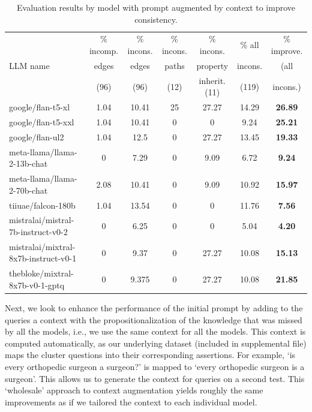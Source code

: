 \documentclass{article} %
\begin{document}
\begin{table}[htbp]
\small
  \centering
  \caption{Evaluation results by model with prompt augmented by context to improve consistency.}
  \setlength{\tabcolsep}{2pt}
  \setlength{\tabcolsep}{2pt}
    \begin{tabular}{lcccccc}
    \toprule
    \multicolumn{1}{l}{\multirow{3}[1]{*}{LLM name}} & \multicolumn{1}{c}{\% incomp.} & \multicolumn{1}{c}{\% incons.} & \multicolumn{1}{c}{\% incons.} & \multicolumn{1}{c}{\% incons.} & \multicolumn{1}{c}{\% all} & \multicolumn{1}{c}{\% improve.}\\
          
    & \multicolumn{1}{c}{edges} & \multicolumn{1}{c}{edges} & \multicolumn{1}{c}{paths} & \multicolumn{1}{c}{property} & \multicolumn{1}{c}{incons.}  & \multicolumn{1}{c}{(all}\\
          & \multicolumn{1}{c}{(96)}      &  (96)     &  (12)     & \multicolumn{1}{c}{inherit. (11)} & \multicolumn{1}{c}{(119)} & \multicolumn{1}{c}{incons.)}\\
    \midrule
    google/flan-t5-xl & 1.04  & 10.41 & 25    & 27.27 & 14.29 & \textbf{26.89} \\
    google/flan-t5-xxl & 1.04  & 10.41 & 0     & 0     & 9.24  & \textbf{25.21} \\
    google/flan-ul2 & 1.04  & 12.5  & 0     & 27.27 & 13.45 & \textbf{19.33} \\
    meta-llama/llama-2-13b-chat & 0     & 7.29  & 0     & 9.09  & 6.72  & \textbf{9.24} \\
    meta-llama/llama-2-70b-chat & 2.08  & 10.41 & 0     & 9.09  & 10.92 & \textbf{15.97} \\
    tiiuae/falcon-180b & 1.04  & 13.54 & 0     & 0     & 11.76 & \textbf{7.56} \\
    mistralai/mistral-7b-instruct-v0-2 & 0     & 6.25  & 0     & 0     & 5.04  & \textbf{4.20} \\
    mistralai/mixtral-8x7b-instruct-v0-1 & 0     & 9.37  & 0     & 27.27 & 10.08 & \textbf{15.13} \\
    thebloke/mixtral-8x7b-v0-1-gptq & 0     & 9.375 & 0     & 27.27 & 10.08 & \textbf{21.85}\\  
    \bottomrule
    \end{tabular}%
  \label{tab:eval_prompt_context}%
\end{table}%


Next, we look to enhance the performance of the initial prompt by adding to the queries a context with the propositionalization of the knowledge that was missed by all the models, i.e., we use the same context for all the models. This context is computed automatically, as our underlying dataset (included in supplemental file) maps the cluster questions into their corresponding assertions. For example, `is every orthopedic surgeon a surgeon?' is mapped to `every orthopedic surgeon is a surgeon'. This allows us to generate the context for queries on a second test. This `wholesale' approach to context augmentation yields roughly the same improvements as if we tailored the context to each individual model. 
\end{document}
